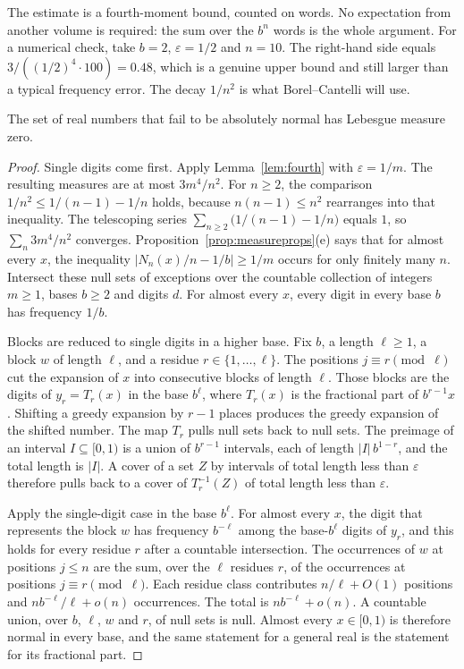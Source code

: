 The estimate is a fourth-moment bound, counted on words.
No expectation from another volume is required: the sum over the $b^n$ words is the whole argument.
For a numerical check, take $b=2$, $\varepsilon=1/2$ and $n=10$.
The right-hand side equals $3/((1/2)^4\cdot 100)=0.48$, which is a genuine upper bound and still larger than a typical frequency error.
The decay $1/n^2$ is what Borel--Cantelli will use.

\begin{theorem}[Borel, 1909]\label{thm:borelnormal}
The set of real numbers that fail to be absolutely normal has Lebesgue measure zero.
\end{theorem}
\begin{proof}
Single digits come first.
Apply Lemma~\ref{lem:fourth} with $\varepsilon=1/m$.
The resulting measures are at most $3m^4/n^2$.
For $n\ge2$, the comparison $1/n^2\le 1/(n-1)-1/n$ holds, because $n(n-1)\le n^2$ rearranges into that inequality.
The telescoping series $\sum_{n\ge2}\bigl(1/(n-1)-1/n\bigr)$ equals $1$, so $\sum_n 3m^4/n^2$ converges.
Proposition~\ref{prop:measureprops}(e) says that for almost every $x$, the inequality $|N_n(x)/n-1/b|\ge 1/m$ occurs for only finitely many $n$.
Intersect these null sets of exceptions over the countable collection of integers $m\ge1$, bases $b\ge2$ and digits $d$.
For almost every $x$, every digit in every base $b$ has frequency $1/b$.

Blocks are reduced to single digits in a higher base.
Fix $b$, a length $\ell\ge1$, a block $w$ of length $\ell$, and a residue $r\in\{1,\ldots,\ell\}$.
The positions $j\equiv r\pmod{\ell}$ cut the expansion of $x$ into consecutive blocks of length $\ell$.
Those blocks are the digits of $y_r=T_r(x)$ in the base $b^\ell$, where $T_r(x)$ is the fractional part of $b^{r-1}x$.
Shifting a greedy expansion by $r-1$ places produces the greedy expansion of the shifted number.
The map $T_r$ pulls null sets back to null sets.
The preimage of an interval $I\subseteq[0,1)$ is a union of $b^{r-1}$ intervals, each of length $|I|\,b^{1-r}$, and the total length is $|I|$.
A cover of a set $Z$ by intervals of total length less than $\varepsilon$ therefore pulls back to a cover of $T_r^{-1}(Z)$ of total length less than $\varepsilon$.

Apply the single-digit case in the base $b^\ell$.
For almost every $x$, the digit that represents the block $w$ has frequency $b^{-\ell}$ among the base-$b^\ell$ digits of $y_r$, and this holds for every residue $r$ after a countable intersection.
The occurrences of $w$ at positions $j\le n$ are the sum, over the $\ell$ residues $r$, of the occurrences at positions $j\equiv r\pmod{\ell}$.
Each residue class contributes $n/\ell+O(1)$ positions and $n b^{-\ell}/\ell+o(n)$ occurrences.
The total is $n b^{-\ell}+o(n)$.
A countable union, over $b$, $\ell$, $w$ and $r$, of null sets is null.
Almost every $x\in[0,1)$ is therefore normal in every base, and the same statement for a general real is the statement for its fractional part.
\end{proof}

